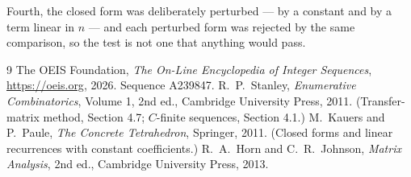 \documentclass[11pt,a4paper]{article}
\theoremstyle{plain}
\theoremstyle{definition}
\begin{document}
Fourth, the closed form was deliberately perturbed --- by a constant and by a term linear in
$n$ --- and each perturbed form was rejected by the same comparison, so the test is not one
that anything would pass.

\begin{thebibliography}{9}
 The OEIS Foundation, \emph{The On-Line Encyclopedia of Integer
Sequences}, \url{https://oeis.org}, 2026. Sequence A239847.
 R.~P.~Stanley, \emph{Enumerative Combinatorics}, Volume 1, 2nd ed.,
Cambridge University Press, 2011. (Transfer-matrix method, Section 4.7; $C$-finite sequences,
Section 4.1.)
 M.~Kauers and P.~Paule, \emph{The Concrete Tetrahedron}, Springer, 2011.
(Closed forms and linear recurrences with constant coefficients.)
 R.~A.~Horn and C.~R.~Johnson, \emph{Matrix Analysis}, 2nd ed., Cambridge
University Press, 2013.
\end{thebibliography}
\end{document}
